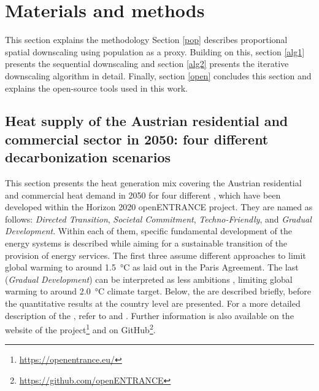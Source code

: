 \section{Materials and methods}\label{methodology}
This section explains the methodology   Section \ref{pop} describes proportional spatial downscaling using population as a proxy. Building on this, section \ref{alg1} presents the sequential downscaling and section \ref{alg2} presents the iterative downscaling algorithm in detail.  Finally, section \ref{open} concludes this section and explains the open-source tools used in this work.

\subsection{Heat supply of the Austrian residential and commercial sector in 2050: four different decarbonization scenarios}\label{res:1}
This section presents the heat generation mix covering the Austrian residential and commercial heat demand in 2050 for four different , which have been developed within the Horizon 2020 openENTRANCE project. They are named as follows: \textit{Directed Transition}, \textit{Societal Commitment}, \textit{Techno-Friendly}, and \textit{Gradual Development}. Within each of them, specific fundamental development of the energy systems is described while aiming for a sustainable transition of the provision of energy services. The first three  assume different approaches to limit global warming to around \SI{1.5}{\degreeCelsius} as laid out in the Paris Agreement. The last  (\textit{Gradual Development}) can be interpreted as less ambitions , limiting global warming to around \SI{2.0}{\degreeCelsius} climate target. Below, the  are described briefly, before the quantitative results at the country level are presented. For a more detailed description of the , refer to \cite{auer2020quantitative} and \cite{auer2020development}. Further information is also available on the website of the project\footnote{\url{https://openentrance.eu/}} and on GitHub\footnote{\url{https://github.com/openENTRANCE}}.\vspace{0.3cm}

